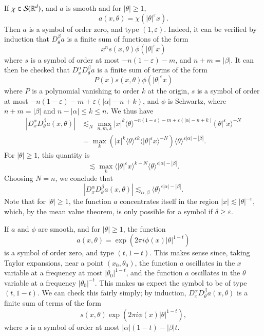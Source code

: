 \begin{example}
    If $\chi \in \mathcal{S}(\operatorname{\mathbb{R}}^d)$, and $a$ is smooth and for $|\theta| \geq 1$,
    \[ a(x,\theta) = \chi \left( |\theta|^\varepsilon x \right). \]
    Then $a$ is a symbol of order zero, and type $(1,\varepsilon)$. Indeed, it can be verified by induction that $D^\beta_\theta a$ is a finite sum of functions of the form
    \[ x^n s(x,\theta) \phi( |\theta|^\varepsilon x ) \]
    where $s$ is a symbol of order at most $-n(1 - \varepsilon) - m$, and $n + m = |\beta|$. It can then be checked that $D^\alpha_x D^\beta_\theta a$ is a finite sum of terms of the form
    \[ P(x) s(x,\theta) \phi( |\theta|^\varepsilon x ) \]
    where $P$ is a polynomial vanishing to order $k$ at the origin, $s$ is a symbol of order at most $-n(1 - \varepsilon) - m + \varepsilon ( |\alpha| - n + k )$, and $\phi$ is Schwartz, where $n + m = |\beta|$ and $n - |\alpha| \leq k \leq n$. We thus have
    \begin{align*}
        |D^\alpha_x D^\beta_\theta a(x,\theta)| &\lesssim_N \max_{n,m,k} |x|^k \langle \theta \rangle^{-n(1 - \varepsilon) - m + \varepsilon (|\alpha| - n + k)} \langle |\theta|^\varepsilon x \rangle^{-N}\\
        &= \max_k \left( |x|^k \langle \theta \rangle^{\varepsilon k} \langle |\theta|^\varepsilon x \rangle^{-N} \right) \langle \theta \rangle^{\varepsilon |\alpha| - |\beta|}.
    \end{align*}
    For $|\theta| \geq 1$, this quantity is
    \[ \lesssim \max_k \langle |\theta|^\varepsilon x \rangle^{k-N} \langle \theta \rangle^{\varepsilon |\alpha| - |\beta|}. \]
    Choosing $N = n$, we conclude that
    \[ |D^\alpha_x D^\beta_\theta a(x,\theta)| \lesssim_{\alpha,\beta} \langle \theta \rangle^{\varepsilon |\alpha| - |\beta|}. \]
    Note that for $|\theta| \geq 1$, the function $a$ concentrates itself in the region $|x| \lesssim |\theta|^{-\varepsilon}$, which, by the mean value theorem, is only possible for a symbol if $\delta \geq \varepsilon$.
\end{example}

\begin{example}
    If $a$ and $\phi$ are smooth, and for $|\theta| \geq 1$, the function
    \[ a(x,\theta) = \exp \left( 2 \pi i \phi(x) |\theta|^{1 - t} \right) \]
    is a symbol of order zero, and type $(t,1-t)$. This makes sense since, taking Taylor expansions, near a point $(x_0,\theta_0)$, the function $a$ oscillates in the $x$ variable at a frequency at most $|\theta_0|^{1-t}$, and the function $a$ oscillates in the $\theta$ variable at a frequency $|\theta_0|^{-t}$. This makes us expect the symbol to be of type $(t,1-t)$. We can check this fairly simply; by induction, $D^\alpha_x D^\beta_\theta a(x,\theta)$ is a finite sum of terms of the form
    \[ s(x,\theta) \exp \left( 2 \pi i \phi(x) |\theta|^{1-t} \right), \]
    where $s$ is a symbol of order at most $|\alpha| (1-t) - |\beta| t$.
\end{example}


